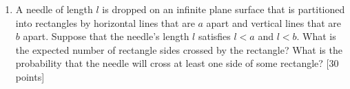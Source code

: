 \documentclass[12pt, oneside]{article}
\begin{document}
\begin{enumerate}
\newpage
\item A needle of length $l$ is dropped on an infinite plane surface that is partitioned into rectangles by horizontal lines that are $a$ apart and vertical lines that are $b$ apart. Suppose that the needle's length $l$ satisfies $l < a$ and $l < b$. What is the expected number of rectangle sides crossed by the rectangle? What is the probability that the needle will cross at least one side of some rectangle?  [30 points]

\end{enumerate}
\end{document}
